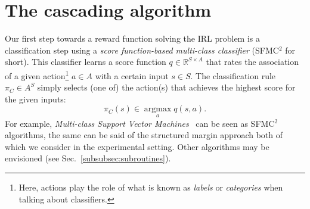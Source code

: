 \documentclass{llncs}
\newcommand{\argmax}{\operatorname*{argmax}} %
\begin{document}
\section{The cascading algorithm}
\label{sec:algo}
Our first step towards a reward function solving the IRL problem is a classification step using a \emph{score function-based multi-class classifier} (SFMC$^2$ for short). This classifier learns a score function $q\in\mathbb{R}^{S\times A}$ that rates the association of a given action\footnote{Here, actions play the role of what is known as {\it labels} or {\it categories} when talking about classifiers.} $a\in A$ with a certain input $s\in S$. The classification rule $\pi_C\in A^S$ simply selects (one of) the action(s) that achieves the highest score for the given inputs:
\begin{equation}
  \label{eq:greedy2}
\pi_C(s) \in \argmax_a q(s,a).
\end{equation}
For example, \emph{Multi-class Support Vector Machines}~\cite{guermeur2011generic} can be seen as SFMC$^2$ algorithms, the same can be said of the structured margin approach \cite{taskar2005learning} both of which we consider in the experimental setting. Other algorithms may be envisioned (see Sec.~\ref{subsubsec:subroutines}). 
\end{document}
